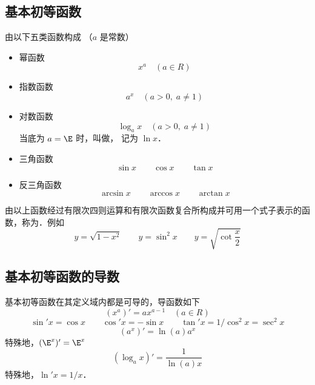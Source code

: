 

\subsection{基本初等函数}
由以下五类函数构成 （$a$ 是常数）

\begin{itemize}
\item 幂函数
\begin{equation}
x^a \quad(a \in R)
\end{equation}
\item 指数函数
\begin{equation}
a^x \quad(a > 0, \; a \ne 1)
\end{equation}
\item 对数函数
\begin{equation}
\log_a x \quad(a > 0, \; a \ne 1)
\end{equation}
当底为 $a = \E$ 时，叫做， 记为 $\ln x$． \\
\item 三角函数
\begin{equation}
\sin x \qquad  \cos x \qquad \tan x
\end{equation}
\item 反三角函数
\begin{equation}
\arcsin x  \qquad \arccos x  \qquad \arctan x
\end{equation}
\end{itemize}

由以上函数经过有限次四则运算和有限次函数复合所构成并可用一个式子表示的函数，称为．例如
\begin{equation}
y = \sqrt{1 - x^2}\qquad y = \sin ^2 x\qquad y = \sqrt{\cot \frac{x}{2}} 
\end{equation}



\subsection{基本初等函数的导数}

基本初等函数在其定义域内都是可导的，导函数如下\\
\begin{equation}
(x^a)' = a x^{a - 1}  \quad (a \in R)
\end{equation}
\begin{equation}
\sin' x = \cos x \qquad \cos' x =  - \sin x \qquad
\tan'x = 1/\cos ^2 x = \sec ^2 x
\end{equation}
\begin{equation}
(a^x)' = \ln(a) a^x
\end{equation}
特殊地，$(\E^x)' = \E^x$\\
\begin{equation}
(\log_a x)' = \frac{1}{\ln(a)x}
\end{equation}
特殊地，$\ln' x= 1/x$．

